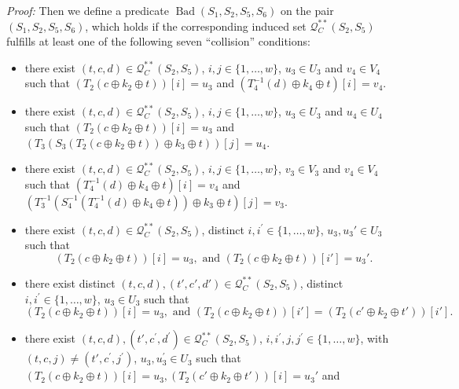 \noindent \emph{Proof:} Then we define a predicate $\operatorname{Bad}\left(S_{1}, S_2, S_{5}, S_6\right)$ on the pair $(S_1,S_2, S_5, S_6)$, which holds if the corresponding induced set $\mathcal{Q}_{C}^{**}\left(S_{2}, S_{5}\right)$ fulfills at least one of the following seven ``collision'' conditions:

\begin{itemize}
  \item[\hone]
  there exist $(t, c, d) \in \mathcal{Q}_{C}^{**}\left(S_{2}, S_{5}\right)$, $i, j \in\{1, \ldots, w\}$, $u_{3} \in U_{3}$ and $v_{4} \in V_{4}$ such that $\left(T_2\left(c \oplus k_{2} \oplus t\right)\right)[i] = u_3$ and $\left(T_{4}^{-1}\left(d \right) \oplus k_{4} \oplus t\right)[i] = v_4$.
  \item[\htwo]
  there exist $(t, c, d) \in \mathcal{Q}_{C}^{**}\left(S_{2}, S_{5}\right)$, $i, j \in\{1, \ldots, w\}$, $u_{3} \in U_{3}$ and $u_{4} \in U_{4}$ such that $\left(T_2\left(c \oplus k_{2} \oplus t\right)\right)[i] = u_3$ and $\left(T_{3}\left(S_{3}\left(T_2\left(c \oplus k_{2} \oplus t\right)\right) \oplus k_{3} \oplus t\right)\right)[j] = u_4$.
  \item[\hthree]
  there exist $(t, c, d) \in \mathcal{Q}_{C}^{**}\left(S_{2}, S_{5}\right)$, $i, j \in\{1, \ldots, w\}$, $v_{3} \in V_{3}$ and $v_{4} \in V_{4}$ such that $\left(T_{4}^{-1}\left(d \right) \oplus k_{4} \oplus t\right)[i] = v_4$ and $\left(T_{3}^{-1}\left(S_{4}^{-1}\left(T_{4}^{-1}\left(d\right) \oplus k_{4} \oplus t\right)\right) \oplus k_{3} \oplus t\right)[j] = v_3$.
  \item[\hfour]
  there exist $(t, c, d) \in \mathcal{Q}_{C}^{**}\left(S_{2}, S_{5}\right)$, distinct $i, i^{\prime}\in\{1, \ldots, w\}$, $u_{3},u_{3}' \in U_{3}$ such that
  $$\left(T_2\left(c \oplus k_{2} \oplus t\right)\right)[i] = u_3,\text{ and }
  \left(T_2\left(c \oplus k_{2} \oplus t\right)\right)[i'] = u_3'.$$
  \item[\hfive]
  there exist distinct $(t, c, d),(t', c', d') \in \mathcal{Q}_{C}^{**}\left(S_{2}, S_{5}\right)$, distinct $i, i^{\prime}\in\{1, \ldots, w\}$, $u_{3} \in U_{3}$ such that
  $$\left(T_2\left(c \oplus k_{2} \oplus t\right)\right)[i] = u_3,\text{ and }
  \left(T_2\left(c \oplus k_{2} \oplus t\right)\right)[i'] =\left(T_2\left(c' \oplus k_{2} \oplus t'\right)\right)[i'].$$
  \item[\hsix]
  there exist $(t, c, d), (t', c^{\prime}, d^{\prime}) \in \mathcal{Q}_{C}^{**}\left(S_{2}, S_{5}\right)$, $i, i^{\prime},j, j^{\prime} \in\{1, \ldots, w\}$, with$(t, c, j) \neq \left(t', c^{\prime}, j^{\prime}\right)$, $u_{3}, u_{3}^{\prime} \in U_{3}$ such that $\left(T_2\left(c \oplus k_{2} \oplus t\right)\right)[i] = u_3,\left(T_2\left(c' \oplus k_{2} \oplus t'\right)\right)[i] = u_3'$ and

\end{itemize}
